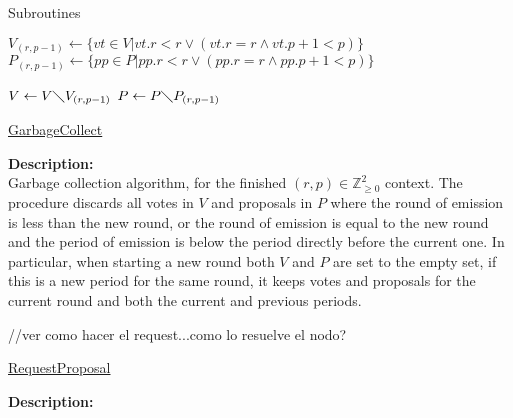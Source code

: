 \documentclass[10pt,a4paper]{article}
\begin{document}
\begin{section}{Subroutines}

\begin{algorithm}[H]\label{algo:garbage-collect}
    \begin{algorithmic}[1]

    \State $V_{(r,p-1)} \gets \{ vt \in V | vt.r < r \lor (vt.r=r \land vt.p + 1 < p) \}$
    \State $P_{(r,p-1)} \gets \{ pp \in P | pp.r < r \lor (pp.r=r \land pp.p + 1 < p) \}$

    \State $V \gets V\diagdown V_{(r,p-1)}$
    \State $P \gets P\diagdown P_{(r,p-1)}$

    \EndFunction
    \end{algorithmic}
    \caption{\underline{GarbageCollect}}
\end{algorithm}

\noindent \textbf{Description:}\\
Garbage collection algorithm, for the finished $(r,p)\in\mathbb{Z}_{\ge 0}^2$ context.
The procedure discards all votes in $V$ and proposals in $P$ where the round of emission is less than the
new round, or the round of emission is equal to the new round and the period of emission is below the period
directly before the current one.
In particular, when starting a new round both $V$ and $P$ are set to the empty set,
if this is a new period for the same round, it keeps votes and proposals for the current round
and both the current and previous periods.


\begin{algorithm}[H]\label{algo:request-proposal}
    \begin{algorithmic}[1]
        //ver como hacer el request...como lo resuelve el nodo?
    \EndFunction
    \end{algorithmic}
    \caption{\underline{RequestProposal}}
\end{algorithm}

\noindent \textbf{Description:}\\



\end{section}
\end{document}
